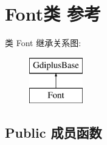 \hypertarget{class_font}{}\section{Font类 参考}
\label{class_font}
类 Font 继承关系图\+:\begin{figure}[H]
\begin{center}
\leavevmode
\includegraphics[height=2.000000cm]{class_font}
\end{center}
\end{figure}
\subsection*{Public 成员函数}
